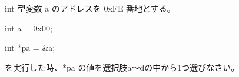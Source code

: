 int 型変数 a のアドレスを 0xFE 番地とする。\par
\noindent int a = 0x00; \par
\noindent int *pa = \&a; \par
を実行した時、*pa の値を選択肢a〜dの中から1つ選びなさい。
